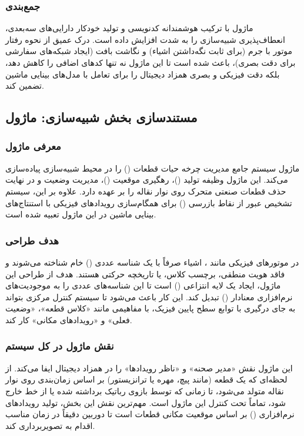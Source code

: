 \documentclass{article}
\begin{document}
\subsubsection{جمع‌بندی}
ماژول  با ترکیب هوشمندانه کدنویسی و تولید خودکار دارایی‌های سه‌بعدی، انعطاف‌پذیری شبیه‌سازی را به شدت افزایش داده است. درک عمیق از نحوه رفتار موتور  با جرم (برای ثابت نگه‌داشتن اشیاء) و نگاشت بافت (ایجاد شبکه‌های سفارشی  برای دقت بصری)، باعث شده است تا این ماژول نه تنها کدهای اضافی را کاهش دهد، بلکه دقت فیزیکی و بصری همزاد دیجیتال را برای تعامل با مدل‌های بینایی ماشین تضمین کند.


\subsection{مستندسازی بخش شبیه‌سازی: ماژول }

\subsubsection{معرفی ماژول}
ماژول  سیستم جامع مدیریت چرخه حیات قطعات () را در محیط شبیه‌سازی پیاده‌سازی می‌کند. این ماژول وظیفه تولید ()، رهگیری موقعیت ()، مدیریت وضعیت و در نهایت حذف قطعات صنعتی متحرک روی نوار نقاله را بر عهده دارد. علاوه بر این، سیستم تشخیص عبور از نقاط بازرسی () برای همگام‌سازی رویدادهای فیزیکی با استنتاج‌های بینایی ماشین در این ماژول تعبیه شده است.

\subsubsection{هدف طراحی}
در موتورهای فیزیکی مانند ، اشیاء صرفاً با یک شناسه عددی () خام شناخته می‌شوند و فاقد هویت منطقی، برچسب کلاس، یا تاریخچه حرکتی هستند. هدف از طراحی این ماژول، ایجاد یک لایه انتزاعی () است تا این شناسه‌های عددی را به موجودیت‌های نرم‌افزاری معنادار () تبدیل کند. این کار باعث می‌شود تا سیستم کنترل مرکزی بتواند به جای درگیری با توابع سطح پایین فیزیک، با مفاهیمی مانند «کلاس قطعه»، «وضعیت فعلی» و «رویدادهای مکانی» کار کند.

\subsubsection{نقش ماژول در کل سیستم}
این ماژول نقش «مدیر صحنه» و «ناظر رویدادها» را در همزاد دیجیتال ایفا می‌کند. از لحظه‌ای که یک قطعه (مانند پیچ، مهره یا ترانزیستور) بر اساس زمان‌بندی روی نوار نقاله متولد می‌شود، تا زمانی که توسط بازوی رباتیک برداشته شده یا از خط خارج شود، تماماً تحت کنترل این ماژول است. مهم‌ترین نقش این بخش، تولید رویدادهای نرم‌افزاری () بر اساس موقعیت مکانی قطعات است تا دوربین دقیقاً در زمان مناسب اقدام به تصویربرداری کند.
\end{document}
